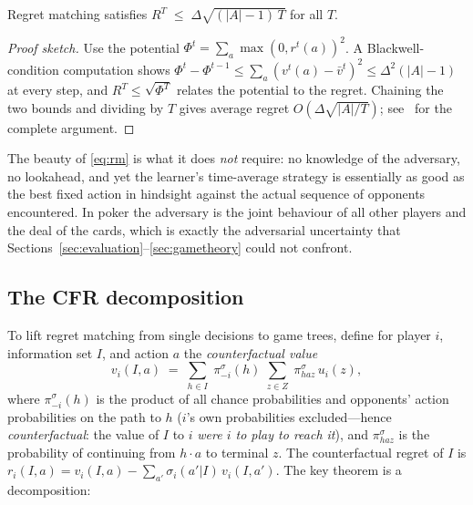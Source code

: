\begin{lemma}\label{lem:rm}
Regret matching satisfies $R^{T} \;\le\; \Delta\sqrt{(|A|-1)\,T}$ for all $T$.
\end{lemma}
\begin{proof}[Proof sketch]
Use the potential $\Phi^{t} = \sum_a \max(0, r^{t}(a))^2$. A Blackwell-condition computation shows $\Phi^{t} - \Phi^{t-1} \le \sum_a (v^t(a) - \bar v^t)^2 \le \Delta^{2}(|A|-1)$ at every step, and $R^{T} \le \sqrt{\Phi^{T}}$ relates the potential to the regret. Chaining the two bounds and dividing by $T$ gives average regret $O(\Delta\sqrt{|A|/T})$; see~\cite{cesabianchi2006prediction} for the complete argument.
\end{proof}

The beauty of \eqref{eq:rm} is what it does \emph{not} require: no knowledge of the adversary, no lookahead, and yet the learner's time-average strategy is essentially as good as the best fixed action in hindsight against the actual sequence of opponents encountered. In poker the adversary is the joint behaviour of all other players and the deal of the cards, which is exactly the adversarial uncertainty that Sections~\ref{sec:evaluation}--\ref{sec:gametheory} could not confront.

\subsection{The CFR decomposition}

To lift regret matching from single decisions to game trees, define for player $i$, information set $I$, and action $a$ the \emph{counterfactual value}
\begin{equation}\label{eq:cfval}
v_{i}(I, a) \;=\; \sum_{h \in I}\; \pi^{\sigma}_{-i}(h)\; \sum_{z \in Z} \; \pi^{\sigma}_{ha z}\, u_{i}(z),
\end{equation}
where $\pi^{\sigma}_{-i}(h)$ is the product of all chance probabilities and opponents' action probabilities on the path to $h$ ($i$'s own probabilities excluded---hence \emph{counterfactual}: the value of $I$ to $i$ \emph{were $i$ to play to reach it}), and $\pi^{\sigma}_{haz}$ is the probability of continuing from $h \cdot a$ to terminal $z$. The counterfactual regret of $I$ is $r_i(I, a) = v_i(I, a) - \sum_{a'} \sigma_i(a'|I)\, v_i(I, a')$. The key theorem is a decomposition:

